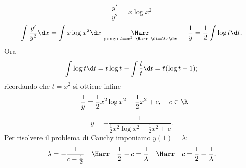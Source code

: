 \documentclass{article}
\begin{document}
\begin{enumerate}[label=\textbf{Esercizio 13.\arabic*.},itemindent=*]
\[\frac{y'}{y^2}=x\log x^2\]
\[\int \frac{y'}{y^2}\d x=\int x\log x^2 \d x~\underset{\text{pongo } t=x^2~\Rarr~\d t=2x\d x}{\Harr}~-\frac{1}{y}=\frac{1}{2}\int \log t \d t .\]
Ora
\[\int \log t\d t =t \log t-\int \frac{t}{t}\d t=t(\log t-1);\]
ricordando che $t=x^2$ si ottiene infine
\[-\frac{1}{y}={\frac{1}{2}x^2\log x^2-\frac{1}{2}x^2+c},\quad c\in \R\]
\[y=-\frac{1}{\frac{1}{2}x^2\log x^2-\frac{1}{2}x^2+c}.\]
Per risolvere il problema di Cauchy imponiamo $y(1)=\lambda$:
\[\lambda =-\frac{1}{c-\frac{1}{2}}~~~\Harr~~~\frac{1}{2}-c=\frac{1}{\lambda}~~~\Harr~~~c=\frac{1}{2}-\frac{1}{\lambda}.\]
\end{enumerate}
\end{document}
